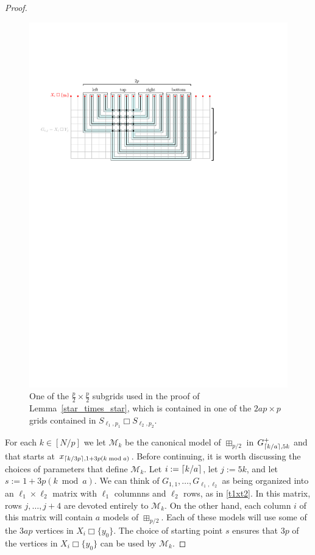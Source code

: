 \documentclass[kpfonts,lotsofwhite]{patmorin}
\newcommand{\boxprod}{\mathbin{\Box}}
\DeclarePairedDelimiter{\ceil}{\lceil}{\rceil}
\theoremstyle{plain}
\theoremstyle{definition}
\begin{document}
\begin{proof}
  \begin{figure}
    \begin{center}
      \includegraphics{subgrid}
    \end{center}
    \caption{One of the $\tfrac p2\times \tfrac p2$ subgrids used in the proof of Lemma~\ref{star_times_star}, which is contained in one of the $2ap\times p$ grids contained in $S_{\ell_1,p_1}\boxprod S_{\ell_2,p_2}$.}
    \label{subgrid}
  \end{figure}

  For each $k\in[N/p]$ we let $\mathcal{M}_k$ be the canonical model of $\boxplus_{p/2}$ in $G_{\ceil{k/a},5k}^+$ and that starts at $x_{\ceil{k/3p},1+3p(k\bmod a)}$.  Before continuing, it is worth discussing the choices of parameters that define $\mathcal{M}_k$.  Let $i:=\ceil{k/a}$, let $j:=5k$, and let $s:=1+3p(k\bmod a)$.  We can think of $G_{1,1},\ldots,G_{\ell_1,\ell_2}$ as being organized into an $\ell_1\times \ell_2$ matrix with $\ell_1$ columnns and $\ell_2$ rows, as in \cref{t1xt2}.  In this matrix, rows $j,\ldots,j+4$ are devoted entirely to $\mathcal{M}_{k}$.  On the other hand, each column $i$ of this matrix will contain $a$ models of $\boxplus_{p/2}$.  Each of these models will use some of the $3ap$ vertices in $X_i\boxprod\{y_0\}$.  The choice of starting point $s$ ensures that $3p$ of the vertices in $X_i\boxprod\{y_0\}$ can be used by $\mathcal{M}_k$.


\end{proof}
\end{document}
